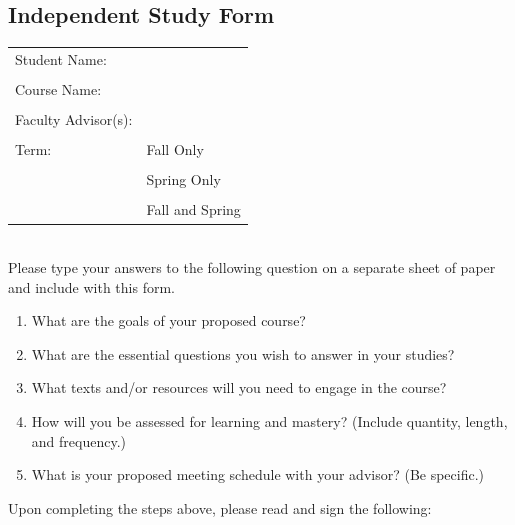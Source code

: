 \newpage


\subsection{Independent Study Form}

\vspace{1cm}



\begin{tabular}{ll}
Student Name: & \underline{\hspace{7cm}}\\
&\\
Course Name:  & \underline{\hspace{7cm}}\\
&\\
Faculty Advisor(s):&  \underline{\hspace{7cm}}\\
&\\
Term: & Fall Only\\
&\\
& Spring Only\\
&\\
& Fall and Spring
\end{tabular}\\












Please type your answers to the following question on a separate sheet of paper and include with this form. 

\begin{enumerate}


  \item What are the goals of your proposed course?
  \item What are the essential questions you wish to answer in your studies?
  \item What texts and/or resources will you need to engage in the course?
  \item How will you be assessed for learning and mastery? (Include quantity, length, and frequency.) 
  \item What is your proposed meeting schedule with your advisor? (Be specific.) 
  \end{enumerate}

\noindent Upon completing the steps above, please read and sign the following: \\


